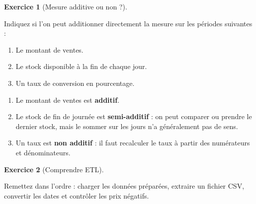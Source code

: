 \documentclass[
  french,
  letterpaper,
  open=any]{scrbook}
\providecommand{\tightlist}{%
  \setlength{\itemsep}{0pt}\setlength{\parskip}{0pt}}
\theoremstyle{definition}
\theoremstyle{definition}
\newtheorem{exercise}{Exercice}[section]
\theoremstyle{remark}
\begin{document}
\begin{exercise}[Mesure additive ou non
?]\protect\hypertarget{exr-dwh-5}{}\label{exr-dwh-5}

Indiquez si l'on peut additionner directement la mesure sur les périodes
suivantes :

\begin{enumerate}
\def\labelenumi{\alph{enumi}.}
\tightlist
\item
  Le montant de ventes.
\item
  Le stock disponible à la fin de chaque jour.
\item
  Un taux de conversion en pourcentage.
\end{enumerate}

\end{exercise}

\begin{tcolorbox}[enhanced jigsaw, arc=.35mm, bottomrule=.15mm, bottomtitle=1mm, breakable, colback=white, colbacktitle=quarto-callout-tip-color!10!white, colframe=quarto-callout-tip-color-frame, coltitle=black, left=2mm, leftrule=.75mm, opacityback=0, opacitybacktitle=0.6, rightrule=.15mm, title=\textcolor{quarto-callout-tip-color}{\faLightbulb}\hspace{0.5em}{Solution de l'exercice Exercice~\ref{exr-dwh-5}}, titlerule=0mm, toprule=.15mm, toptitle=1mm]

\begin{enumerate}
\def\labelenumi{\alph{enumi}.}
\tightlist
\item
  Le montant de ventes est \textbf{additif}.
\item
  Le stock de fin de journée est \textbf{semi-additif} : on peut
  comparer ou prendre le dernier stock, mais le sommer sur les jours n'a
  généralement pas de sens.
\item
  Un taux est \textbf{non additif} : il faut recalculer le taux à partir
  des numérateurs et dénominateurs.
\end{enumerate}

\end{tcolorbox}

\begin{exercise}[Comprendre
ETL]\protect\hypertarget{exr-dwh-6}{}\label{exr-dwh-6}

Remettez dans l'ordre : charger les données préparées, extraire un
fichier CSV, convertir les dates et contrôler les prix négatifs.

\end{exercise}
\end{document}
